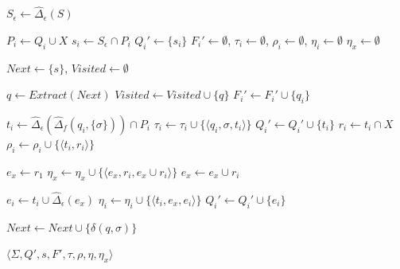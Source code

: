   \SetAlgoNoLine
  \begin{algorithm}[H]
    \caption{Quasi-determinization of a k-separated finite-state automaton}
    \label{alg:quasi_det_sfsa}

    \DontPrintSemicolon

    $S_\epsilon \gets \hat{\Delta}_\epsilon(S)$\;

     {
      $P_i \gets Q_i \cup X$\;
      $s_i \gets S_\epsilon \cap P_i$\;
      $Q_i' \gets \{ s_i \}$\;
      $F_i' \gets \emptyset$, $\tau_i \gets \emptyset$, $\rho_i \gets \emptyset$,
      $\eta_i \gets \emptyset$\;
    }
    $\eta_x \gets \emptyset$\;

    $Next \gets \{ s \}$, $Visited \gets \emptyset$\;

     {
      $q \gets Extract(Next)$\;
      $Visited \gets Visited \cup \{ q \}$\;
       {
         {
          $F_i' \gets F_i' \cup \{ q_i \}$\;
        }
      }

      \For {$\sigma \in \Sigma$} {
         {
          $t_i \gets \hat{\Delta}_\epsilon(\hat{\Delta}_f(q_i, \{
            \sigma \})) \cap P_i$\;
          $\tau_i \gets \tau_i \cup \{ \langle q_i, \sigma, t_i
            \rangle \}$\;
          $Q_i' \gets Q_i' \cup \{ t_i \}$\;
          $r_i \gets t_i \cap X$\;
          $\rho_i \gets \rho_i \cup \{ \langle t_i, r_i \rangle
            \}$\;
        }

	$e_x \gets r_1$\;
	 {
          $\eta_x \gets \eta_x \cup \{ \langle e_x, r_i, e_x \cup r_i \rangle \}$\; 
          $e_x \gets e_x \cup r_i$\;
        }

         {
          $e_i \gets t_i \cup \hat{\Delta}_\epsilon(e_x)$\;
          $\eta_i \gets \eta_i \cup \{ \langle t_i, e_x, e_i \rangle \}$\;    
          $Q_i' \gets Q_i' \cup \{ e_i \}$\;
        }

         {
          $Next \gets Next \cup \{ \delta(q, \sigma) \}$\;
        }
      }
    }

    \Return $\langle \Sigma, Q', s, F', \tau, \rho, \eta, \eta_x \rangle$
  \end{algorithm}

